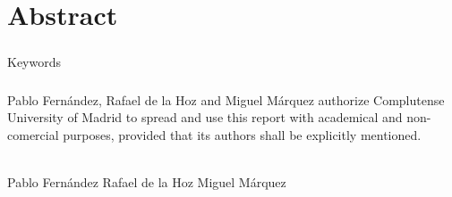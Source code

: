 \chapter*{Abstract}
\label{cha:abstract}
	
	
\newpage 
	\paragraph{}
	{\huge Keywords}
	\paragraph{}


\newpage %
	\paragraph{}
	Pablo Fernández, Rafael de la Hoz and Miguel Márquez authorize Complutense University 
	of Madrid to spread and use this report with academical and non-comercial purposes,
	provided that its authors shall be explicitly mentioned.
	\begin{center}
    	\thedate \\
	    \vspace{5.5in}
		Pablo Fernández\hspace{0.75in}
		Rafael de la Hoz\hspace{0.75in}
		Miguel Márquez
	\end{center}

